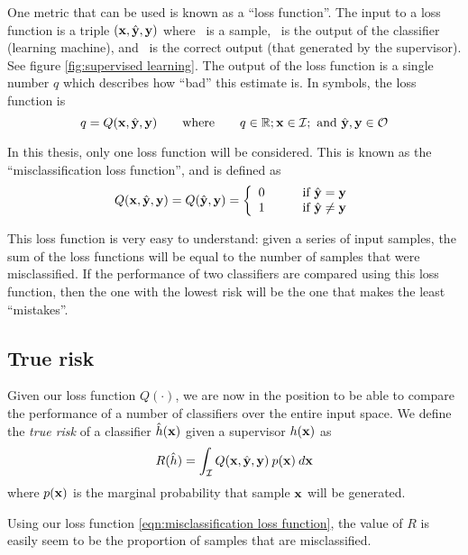 One metric that can be used is known as a ``loss function''.  The
input to a loss function is a triple $(\mathbf{x}, \hat{\mathbf{y}}, \mathbf{y})$ where \bfx\
is a sample, \bfyh\ is the output of the classifier (learning
machine), and \bfy\ is the correct output (that generated by the
supervisor).  See figure \ref{fig:supervised learning}.  The output of
the loss function is a single number $q$ which describes how ``bad''
this estimate is.  In symbols, the loss function is
%
\begin{equation}
q = Q(\mathbf{x}, \hat{\mathbf{y}}, \mathbf{y}) \qquad \mbox{where} \qquad q \in \mathbb{R};
\mathbf{x} \in \mathcal{I}; \mbox{ and }\hat{\mathbf{y}}, \mathbf{y} \in \mathcal{O}
\end{equation}

In this thesis, only one loss function will be considered.  This is
known as the ``misclassification loss function'', and is defined as
%
\begin{equation}
Q(\mathbf{x}, \hat{\mathbf{y}}, \mathbf{y}) = Q(\hat{\mathbf{y}}, \mathbf{y}) = \left\{
\begin{array}{ll}
	0	&	\qquad \mbox{if $\hat{\mathbf{y}} = \mathbf{y}$} \\
	1	&	\qquad \mbox{if $\hat{\mathbf{y}} \neq \mathbf{y}$}
\end{array}
\right.
\label{eqn:misclassification loss function}
\end{equation}

This loss function is very easy to understand: given a series of input
samples, the sum of the loss functions will be equal to the number of
samples that were misclassified.  If the performance of two
classifiers are compared using this loss function, then the one with
the lowest risk will be the one that makes the least ``mistakes''.


\subsection{True risk}
\label{sec:true risk}
Given our loss function $Q(\cdot)$, we are now in the position to be
able to compare the performance of a number of classifiers over the
entire input space.  We define the \emph{true risk} of a classifier
$\hat{h}(\mathbf{x})$ given a supervisor $h(\mathbf{x})$ as
%
\begin{equation}
R(\hat{h}) = \int_{\mathcal{I}} Q(\mathbf{x}, \hat{\mathbf{y}}, \mathbf{y}) \: p(\mathbf{x}) \: d\mathbf{x}
\label{eqn:true risk}
\end{equation}
%
where $p(\mathbf{x})$ is the marginal probability that sample $\mathbf{x}$ will be
generated.

Using our loss function \ref{eqn:misclassification loss function}, the
value of $R$ is easily seem to be the proportion of samples that are
misclassified.

